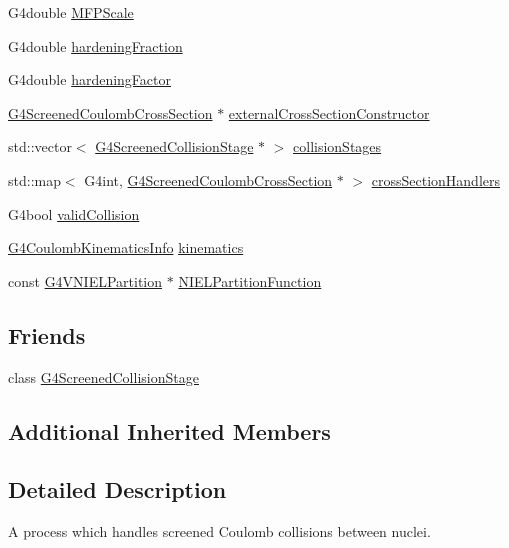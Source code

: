 \begin{DoxyCompactItemize}
\item 
G4double \hyperlink{classG4ScreenedNuclearRecoil_a3dd51e98d3a0ce4c351633bd79eac590}{M\+F\+P\+Scale}
\item 
G4double \hyperlink{classG4ScreenedNuclearRecoil_ad07667d26ae00e2498cdb6ed9c96f4c6}{hardening\+Fraction}
\item 
G4double \hyperlink{classG4ScreenedNuclearRecoil_a988377cb58e0d3ea9e9b8b47fdff0668}{hardening\+Factor}
\item 
\hyperlink{classG4ScreenedCoulombCrossSection}{G4\+Screened\+Coulomb\+Cross\+Section} $\ast$ \hyperlink{classG4ScreenedNuclearRecoil_ae7c806b57b6b3af7dae77fa53ed76e8a}{external\+Cross\+Section\+Constructor}
\item 
std\+::vector$<$ \hyperlink{classG4ScreenedCollisionStage}{G4\+Screened\+Collision\+Stage} $\ast$ $>$ \hyperlink{classG4ScreenedNuclearRecoil_a0d3ecbaa25714e7a92a69fcae7833662}{collision\+Stages}
\item 
std\+::map$<$ G4int, \hyperlink{classG4ScreenedCoulombCrossSection}{G4\+Screened\+Coulomb\+Cross\+Section} $\ast$ $>$ \hyperlink{classG4ScreenedNuclearRecoil_a9860a5abf8c2239adad8d1635612d6a1}{cross\+Section\+Handlers}
\item 
G4bool \hyperlink{classG4ScreenedNuclearRecoil_a995a78de62358db496505ab0f39de0a1}{valid\+Collision}
\item 
\hyperlink{structG4CoulombKinematicsInfo}{G4\+Coulomb\+Kinematics\+Info} \hyperlink{classG4ScreenedNuclearRecoil_ae7539ec7406f555a9655e4da0b78f05b}{kinematics}
\item 
const \hyperlink{classG4VNIELPartition}{G4\+V\+N\+I\+E\+L\+Partition} $\ast$ \hyperlink{classG4ScreenedNuclearRecoil_a23c8089692df12b1bc82b5402f86dfea}{N\+I\+E\+L\+Partition\+Function}
\end{DoxyCompactItemize}
\subsection*{Friends}
\begin{DoxyCompactItemize}
\item 
class \hyperlink{classG4ScreenedNuclearRecoil_a13d7049bfd5b31725b6ce577a38eb362}{G4\+Screened\+Collision\+Stage}
\end{DoxyCompactItemize}
\subsection*{Additional Inherited Members}


\subsection{Detailed Description}
A process which handles screened Coulomb collisions between nuclei. 


